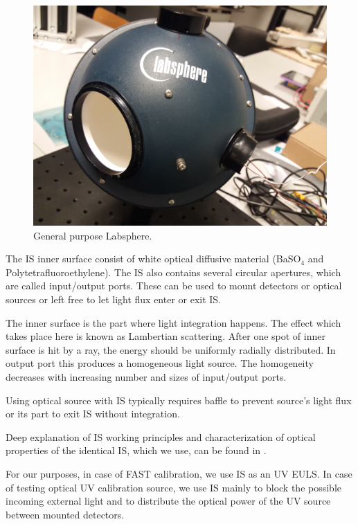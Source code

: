 \begin{figure}[H]
 \centering
 \includegraphics[scale=0.09, angle = 180]{./pictures/IntegrationSphere}
 \caption{General purpose Labsphere.}
 \label{Labsphere}
 
\end{figure}
\par
The IS inner surface consist of white optical diffusive material (BaSO$_4$ and Polytetrafluoroethylene). The IS also contains several circular apertures, which are called input/output ports. These can be used to mount detectors or optical sources or left free to let light flux enter or exit IS. 
\par
The inner surface is the part where light integration happens. The effect which takes place here is known as Lambertian scattering. After one spot of inner surface is hit by a ray, the energy should be uniformly radially distributed. In output port this produces a homogeneous light source. The homogeneity decreases with increasing number and sizes of input/output ports.
\par
Using optical source with IS typically requires baffle to prevent source's light flux or its part to exit IS without integration.
\par
Deep explanation of IS working principles and characterization of optical properties of the identical IS, which we use, can be found in \cite{VACULA2021167169}.
\par
For our purposes, in case of FAST calibration, we use IS as an UV EULS. In case of testing optical UV calibration source, we use IS mainly to block the possible incoming external light and to distribute the optical power of the UV source between mounted detectors.

